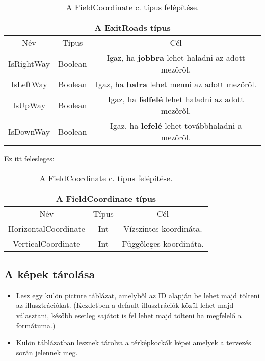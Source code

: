 \begin{table}[H]
	\centering
	\begin{tabular}{ |c|c|c| }
		\hline
		\multicolumn{3}{|c|}{A ExitRoads típus}\\
		\hline
		Név & Típus & Cél \\
		\hline
		IsRightWay  & Boolean  & Igaz, ha \textbf{jobbra} lehet haladni az adott mezőről.  \\
		\hline
		IsLeftWay & Boolean & Igaz, ha \textbf{balra} lehet menni az adott mezőről.\\
		\hline
		IsUpWay & Boolean & Igaz, ha \textbf{felfelé} lehet haladni az adott mezőről.\\
		\hline
		IsDownWay & Boolean & Igaz, ha \textbf{lefelé} lehet továbbhaladni a mezőről.\\
		\hline
	\end{tabular}
	\caption[FielCoordinate típus]{A FieldCoordinate c. típus felépítése.}
	\label{tab:field}
\end{table}

Ez itt felesleges:
\begin{table}[H]
	\centering
	\begin{tabular}{ |c|c|c| }
		\hline
		\multicolumn{3}{|c|}{A FieldCoordinate típus}\\
		\hline
		Név & Típus & Cél \\
		\hline
		HorizontalCoordinate  & Int  & Vízszintes koordináta.  \\
		\hline
		VerticalCoordinate & Int &Függőleges koordináta.\\
		\hline
	\end{tabular}
	\caption[FielCoordinate típus]{A FieldCoordinate c. típus felépítése.}
	\label{tab:field}
\end{table}

\subsection{A képek tárolása}

\begin{itemize}
	\item Lesz egy külön picture táblázat, amelyből az ID alapján be lehet majd tölteni az illusztrációkat. (Kezdetben a default illusztrációk közül lehet majd választani, később esetleg sajátot is fel lehet majd tölteni ha megfelelő a formátuma.)
	
	\item Külön táblázatban lesznek tárolva a térképkockák képei amelyek a tervezés során jelennek meg.
\end{itemize}

